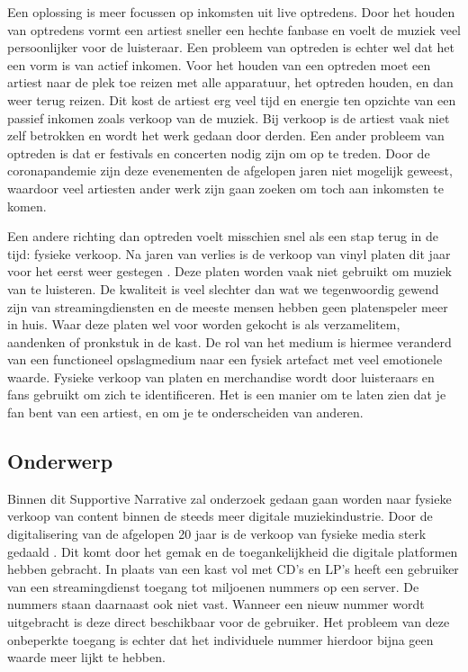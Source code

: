 Een oplossing is meer focussen op inkomsten uit live optredens. Door het houden van optredens vormt een artiest sneller een hechte fanbase en voelt de muziek veel persoonlijker voor de luisteraar. Een probleem van optreden is echter wel dat het een vorm is van actief inkomen. Voor het houden van een optreden moet een artiest naar de plek toe reizen met alle apparatuur, het optreden houden, en dan weer terug reizen. Dit kost de artiest erg veel tijd en energie ten opzichte van een passief inkomen zoals verkoop van de muziek. Bij verkoop is de artiest vaak niet zelf betrokken en wordt het werk gedaan door derden. Een ander probleem van optreden is dat er festivals en concerten nodig zijn om op te treden. Door de coronapandemie zijn deze evenementen de afgelopen jaren niet mogelijk geweest, waardoor veel artiesten ander werk zijn gaan zoeken om toch aan inkomsten te komen.

Een andere richting dan optreden voelt misschien snel als een stap terug in de tijd: fysieke verkoop. Na jaren van verlies is de verkoop van vinyl platen dit jaar voor het eerst weer gestegen \cite{year_end_2022_RIAA_revenue_statistics}. Deze platen worden vaak niet gebruikt om muziek van te luisteren. De kwaliteit is veel slechter dan wat we tegenwoordig gewend zijn van streamingdiensten en de meeste mensen hebben geen platenspeler meer in huis. Waar deze platen wel voor worden gekocht is als verzamelitem, aandenken of pronkstuk in de kast. De rol van het medium is hiermee veranderd van een functioneel opslagmedium naar een fysiek artefact met veel emotionele waarde. Fysieke verkoop van platen en merchandise wordt door luisteraars en fans gebruikt om zich te identificeren. Het is een manier om te laten zien dat je fan bent van een artiest, en om je te onderscheiden van anderen.

\subsection{Onderwerp}
Binnen dit Supportive Narrative zal onderzoek gedaan gaan worden naar fysieke verkoop van content binnen de steeds meer digitale muziekindustrie. Door de digitalisering van de afgelopen 20 jaar is de verkoop van fysieke media sterk gedaald \cite{dong2022valueofmusic}. Dit komt door het gemak en de toegankelijkheid die digitale platformen hebben gebracht. In plaats van een kast vol met CD's en LP's heeft een gebruiker van een streamingdienst toegang tot miljoenen nummers op een server. De nummers staan daarnaast ook niet vast. Wanneer een nieuw nummer wordt uitgebracht is deze direct beschikbaar voor de gebruiker. Het probleem van deze onbeperkte toegang is echter dat het individuele nummer hierdoor bijna geen waarde meer lijkt te hebben.

